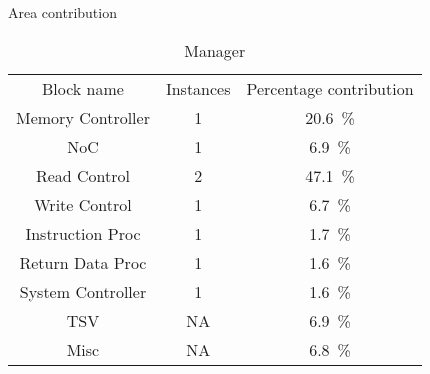 \begin{table}[h]
  \captionsetup{justification=centering, skip=3pt}
  \caption{Area contribution}
  \vspace{3pt}
  \label{tab:Area contribution}
  \centering
  \begin{subtable}{1\textwidth}
    \centering
    \begin{adjustbox}{width=0.50\textwidth}
      \begin{tabular}{|c|c|c|}
        \hline
       \multirow{2}{*}{Block name}    &  \multirow{2}{*}{Instances}        &  \multirow{2}{*}{Percentage contribution}     \\  %
                                      &                                    &                                               \\
        \hline  %
  Memory Controller      & 1&\SI[per-mode=symbol]{20.6}{\percent}  \\ 
        NoC              & 1&\SI[per-mode=symbol]{ 6.9}{\percent}  \\
        Read Control     & 2&\SI[per-mode=symbol]{47.1}{\percent}  \\
        Write Control    & 1&\SI[per-mode=symbol]{ 6.7}{\percent}  \\
      Instruction Proc   & 1&\SI[per-mode=symbol]{ 1.7}{\percent}  \\
      Return Data Proc   & 1&\SI[per-mode=symbol]{ 1.6}{\percent}  \\
      System Controller  & 1&\SI[per-mode=symbol]{ 1.6}{\percent}  \\
        TSV              &NA&\SI[per-mode=symbol]{ 6.9}{\percent}  \\
        Misc             &NA&\SI[per-mode=symbol]{ 6.8}{\percent}  \\
        \hline
      \end{tabular}
    \end{adjustbox}
    \vspace{3pt}
    \captionsetup{justification=centering, skip=10pt}
    \caption{Manager}
    \label{tab:Manager Area Contribution}
  \end{subtable}
  \bigskip
  \begin{subtable}{1\textwidth}

\end{subtable}
\end{table}
